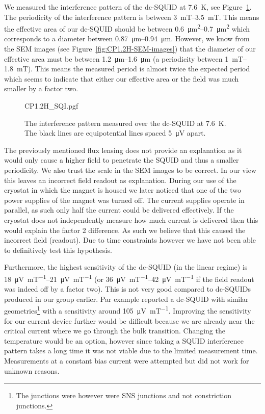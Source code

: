 We measured the interference pattern of the dc-SQUID at \qty{7.6}{\kelvin}, see Figure~\ref{fig:CP1.1H-SQUID-SQI}. The periodicity of the interference pattern is between \qtyrange{3}{3.5}{\milli\tesla}. This means the effective area of our dc-SQUID should be between \qtyrange{0.6}{0.7}{\square\micro\meter} which corresponds to a diameter between \qtyrange{0.87}{0.94}{\micro\meter}. However, we know from the SEM images (see Figure~\ref{fig:CP1.2H-SEM-images}) that the diameter of our effective area must be between \qtyrange{1.2}{1.6}{\micro\meter} (a periodicity between \qtyrange{1}{1.8}{\milli\tesla}). This means the measured period is almost twice the expected period which seems to indicate that either our effective area or the field was much smaller by a factor two.

\begin{figure}[ht]
	\centering
	{CP1.2H_SQI.pgf}
	\caption{The interference pattern measured over the dc-SQUID at \qty{7.6}{\kelvin}. The black lines are equipotential lines spaced \qty{5}{\micro\volt} apart.}
	\label{fig:CP1.1H-SQUID-SQI}
\end{figure}

The previously mentioned flux lensing\cite{prigozhin3DSimulationSuperconducting2018} does not provide an explanation as it would only cause a higher field to penetrate the SQUID and thus a smaller periodicity. We also trust the scale in the SEM images to be correct. In our view this leaves an incorrect field readout as explanation. During our use of the cryostat in which the magnet is housed we later noticed that one of the two power supplies of the magnet was turned off. The current supplies operate in parallel, as such only half the current could be delivered effectively. If the cryostat does not independently measure how much current is delivered then this would explain the factor 2 difference. As such we believe that this caused the incorrect field (readout). Due to time constraints however we have not been able to definitively test this hypothesis.

Furthermore, the highest sensitivity of the dc-SQUID (in the linear regime) is \qtyrange{18}{21}{\micro\volt\per\milli\tesla} (or \qtyrange{36}{42}{\micro\volt\per\milli\tesla} if the field readout was indeed off by a factor two). This is not very good compared to dc-SQUIDs produced in our group earlier. Par example \citeauthor{rogSQUIDontipMagneticMicroscopy2022} \citeyear{rogSQUIDontipMagneticMicroscopy2022} reported a dc-SQUID with similar geometries\footnote{The junctions were however were SNS junctions and not constriction junctions.} with a sensitivity around \qty{105}{\micro\volt\per\milli\tesla}\cite{rogSQUIDontipMagneticMicroscopy2022}. Improving the sensitivity for our current device further would be difficult because we are already near the critical current where we go through the bulk transition. Changing the temperature would be an option, however since taking a SQUID interference pattern takes a long time it was not viable due to the limited measurement time. Measurements at a constant bias current were attempted but did not work for unknown reasons.

